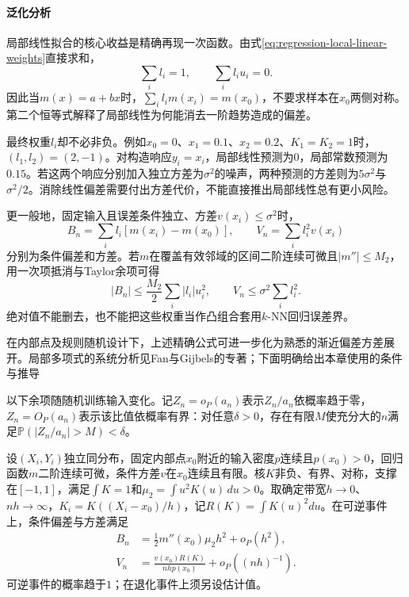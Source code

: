 \paragraph{泛化分析}
局部线性拟合的核心收益是精确再现一次函数。由式\eqref{eq:regression-local-linear-weights}直接求和，
\[
  \sum_i l_i=1,\qquad \sum_i l_i u_i=0.
\]
因此当$m(x)=a+bx$时，$\sum_i l_i m(x_i)=m(x_0)$，不要求样本在$x_0$两侧对称。第二个恒等式解释了局部线性为何能消去一阶趋势造成的偏差。

最终权重$l_i$却不必非负。例如$x_0=0$、$x_1=0.1$、$x_2=0.2$、$K_1=K_2=1$时，$(l_1,l_2)=(2,-1)$。对构造响应$y_i=x_i$，局部线性预测为$0$，局部常数预测为$0.15$。若这两个响应分别加入独立方差为$\sigma^2$的噪声，两种预测的方差则为$5\sigma^2$与$\sigma^2/2$。消除线性偏差需要付出方差代价，不能直接推出局部线性总有更小风险。

更一般地，固定输入且误差条件独立、方差$v(x_i)\leq\sigma^2$时，
\[
  B_n=\sum_i l_i[m(x_i)-m(x_0)],\qquad
  V_n=\sum_i l_i^2v(x_i)
\]
分别为条件偏差和方差。若$m$在覆盖有效邻域的区间二阶连续可微且$|m''|\leq M_2$，用一次项抵消与Taylor余项可得
\[
  |B_n|\leq\frac{M_2}{2}\sum_i|l_i|u_i^2,\qquad
  V_n\leq\sigma^2\sum_i l_i^2.
\]
绝对值不能删去，也不能把这些权重当作凸组合套用$k$-NN回归误差界。

在内部点及规则随机设计下，上述精确公式可进一步化为熟悉的渐近偏差方差展开。局部多项式的系统分析见Fan与Gijbels的专著；下面明确给出本章使用的条件与推导

以下余项随随机训练输入变化。记$Z_n=o_P(a_n)$表示$Z_n/a_n$依概率趋于零，$Z_n=O_P(a_n)$表示该比值依概率有界：对任意$\delta>0$，存在有限$M$使充分大的$n$满足$\mathbb{P}(|Z_n/a_n|>M)<\delta$。

\begin{theorem}[一维内部点的局部线性展开]
  \label{thm:regression-local-asymptotic}
  设$(X_i,Y_i)$独立同分布，固定内部点$x_0$附近的输入密度$p$连续且$p(x_0)>0$，回归函数$m$二阶连续可微，条件方差$v$在$x_0$连续且有限。核$K$非负、有界、对称，支撑在$[-1,1]$，满足$\int K=1$和$\mu_2=\int u^2K(u)\,du>0$。取确定带宽$h\to0$、$nh\to\infty$，$K_i=K((X_i-x_0)/h)$，记$R(K)=\int K(u)^2du$。在可逆事件上，条件偏差与方差满足
  \begin{align*}
    B_n&=\tfrac12 m''(x_0)\mu_2h^2+o_P(h^2),\\
    V_n&=\frac{v(x_0)R(K)}{nhp(x_0)}+o_P((nh)^{-1}).
  \end{align*}
  可逆事件的概率趋于$1$；在退化事件上须另设估计值。
\end{theorem}

